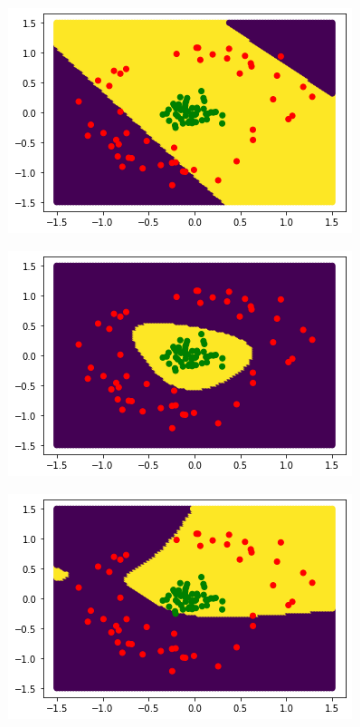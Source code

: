 \documentclass[review]{siamart190516}
\begin{document}
\begin{figure}[!h]

		\hfill
		\begin{subfigure}[b]{0.325\textwidth}  
			\centering 
			\includegraphics[width=\textwidth]{Images/gd.png}
			\caption{}
			\label{fig:gd}
		\end{subfigure}
		\hfill
			\begin{subfigure}[b]{0.325\textwidth}  
			\centering 
			\includegraphics[width=\textwidth]{Images/mode.png}
			\caption{}
			\label{fig:mode}
		\end{subfigure}
		\hfill
		\begin{subfigure}[b]{0.325\textwidth}  
			\centering 
			\includegraphics[width=\textwidth]{Images/bma.png}

\end{subfigure}
\end{figure}
\end{document}
